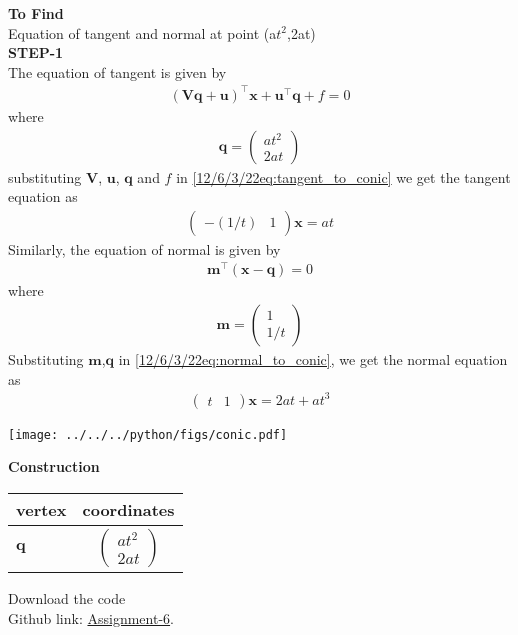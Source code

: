 \documentclass[10pt,a4paper]{report}
\newcommand{\myvec}[1]{\ensuremath{\begin{pmatrix}#1\end{pmatrix}}}
\let\vec\mathbf
\let\vec\mathbf
\begin{document}
\begin{multicols}{2}
\textbf{To Find }\vspace{2mm}\\
Equation of tangent and normal at  point (a$t^2$,2at) \vspace{5mm}  \\ 
\textbf{STEP-1}\vspace{2mm}\\
\fi
The equation of tangent is given by
\begin{align}
\label{12/6/3/22eq:tangent_to_conic}
 \vec{(Vq+u)}^{\top}\vec{x}+\vec{u}^{\top}\vec{q}+f =0 
\end{align}
where
\begin{align}
\vec{q}=\myvec{at^2\\
2at}
\end{align}
substituting $\vec{V}$, $\vec{u}$, $\vec{q}$ and $f$ in \eqref{12/6/3/22eq:tangent_to_conic} we get the tangent equation as
\begin{align}
	\myvec{-(1/t) & 1} \vec{x}=at
\end{align}
Similarly, 
the equation of normal is given by
\begin{align}
\label{12/6/3/22eq:normal_to_conic}
\vec{m}^{\top}(\vec{x}-\vec{q})=0
\end{align}
where 
\begin{align}
\vec{m}=\myvec{1\\
1/t}
\end{align}
Substituting $\vec{m}$,$\vec{q}$ in \eqref{12/6/3/22eq:normal_to_conic}, we get the normal equation as
\begin{align}
	\myvec{t & 1} \vec{x}=2at+at^3
\end{align}
\iffalse
\begin{center}
\texttt{[image: ../../../python/figs/conic.pdf]} 
 \end{center}\vspace{1mm}
 
 \vspace{2mm} \textbf{Construction}
\begin{center}
\setlength{\arrayrulewidth}{0.5mm}
\setlength{\tabcolsep}{6pt}
\renewcommand{\arraystretch}{1.5}
    \begin{tabular}{|l|c|}
    \hline 
    \textbf{vertex} & \textbf{coordinates} \\ \hline
  $\vec{q}$ & $\myvec{
   at^2\\
   2at
   } $\\\hline
      \end{tabular}
  \end{center}
  
\raggedright  Download the code \\
Github link: \href{https://github.com/KrishnaYadati/Assignments/blob/main/Matrix_conic_assignment/codes/conic.py}{Assignment-6}.
  \end{multicols}
\end{document}
